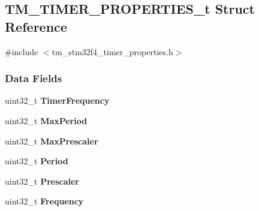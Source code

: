 \hypertarget{struct_t_m___t_i_m_e_r___p_r_o_p_e_r_t_i_e_s__t}{}\subsection{T\+M\+\_\+\+T\+I\+M\+E\+R\+\_\+\+P\+R\+O\+P\+E\+R\+T\+I\+E\+S\+\_\+t Struct Reference}
\label{struct_t_m___t_i_m_e_r___p_r_o_p_e_r_t_i_e_s__t}


{\ttfamily \#include $<$tm\+\_\+stm32f4\+\_\+timer\+\_\+properties.\+h$>$}

\subsubsection*{Data Fields}
\begin{DoxyCompactItemize}
\item 
\hypertarget{struct_t_m___t_i_m_e_r___p_r_o_p_e_r_t_i_e_s__t_ae10d5f63ef782da7eb280dd4876a29ed}{}uint32\+\_\+t {\bfseries Timer\+Frequency}\label{struct_t_m___t_i_m_e_r___p_r_o_p_e_r_t_i_e_s__t_ae10d5f63ef782da7eb280dd4876a29ed}

\item 
\hypertarget{struct_t_m___t_i_m_e_r___p_r_o_p_e_r_t_i_e_s__t_a3a30aa7ed31c3599e989be45885671ec}{}uint32\+\_\+t {\bfseries Max\+Period}\label{struct_t_m___t_i_m_e_r___p_r_o_p_e_r_t_i_e_s__t_a3a30aa7ed31c3599e989be45885671ec}

\item 
\hypertarget{struct_t_m___t_i_m_e_r___p_r_o_p_e_r_t_i_e_s__t_afc34e3e648b8a298bcd158635b7a5735}{}uint32\+\_\+t {\bfseries Max\+Prescaler}\label{struct_t_m___t_i_m_e_r___p_r_o_p_e_r_t_i_e_s__t_afc34e3e648b8a298bcd158635b7a5735}

\item 
\hypertarget{struct_t_m___t_i_m_e_r___p_r_o_p_e_r_t_i_e_s__t_a49500eef6a2354eeee4adc005bf9cef6}{}uint32\+\_\+t {\bfseries Period}\label{struct_t_m___t_i_m_e_r___p_r_o_p_e_r_t_i_e_s__t_a49500eef6a2354eeee4adc005bf9cef6}

\item 
\hypertarget{struct_t_m___t_i_m_e_r___p_r_o_p_e_r_t_i_e_s__t_affb82025da5b8d4a06e61f1690460f4d}{}uint32\+\_\+t {\bfseries Prescaler}\label{struct_t_m___t_i_m_e_r___p_r_o_p_e_r_t_i_e_s__t_affb82025da5b8d4a06e61f1690460f4d}

\item 
\hypertarget{struct_t_m___t_i_m_e_r___p_r_o_p_e_r_t_i_e_s__t_ade3d190636488dad9a89b19446b7acf1}{}uint32\+\_\+t {\bfseries Frequency}\label{struct_t_m___t_i_m_e_r___p_r_o_p_e_r_t_i_e_s__t_ade3d190636488dad9a89b19446b7acf1}

\end{DoxyCompactItemize}


